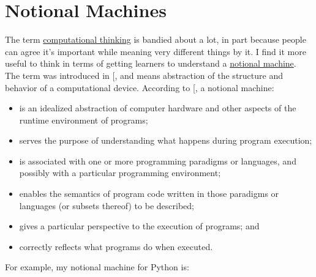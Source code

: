 \section{Notional Machines}\label{notional-machines}

The term \protect\hyperlink{g:computational-thinking}{computational thinking} is
bandied about a lot, in part because people can agree it's important
while meaning very different things by it. I find it more useful to
think in terms of getting learners to understand a \protect\hyperlink{g:notional-machine}{notional
machine}. The term was introduced in
{[}\protect[\hyperlink{b:DuBo1986}{DuBo1986}]{]}, and means abstraction of the structure and
behavior of a computational device. According to {[}\protect[\hyperlink{b:Sorv2013}{Sorv2013}]{]},
a notional machine:

\begin{itemize}
\item
  is an idealized abstraction of computer hardware and other aspects
  of the runtime environment of programs;
\item
  serves the purpose of understanding what happens during program
  execution;
\item
  is associated with one or more programming paradigms or languages,
  and possibly with a particular programming environment;
\item
  enables the semantics of program code written in those paradigms or
  languages (or subsets thereof) to be described;
\item
  gives a particular perspective to the execution of programs; and
\item
  correctly reflects what programs do when executed.
\end{itemize}

For example, my notional machine for Python is:

